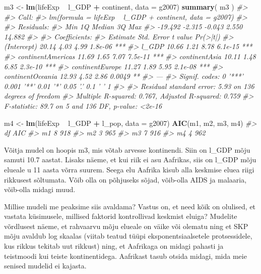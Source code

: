 \documentclass[]{book}
\newenvironment{Shaded}{\begin{snugshade}}{\end{snugshade}}
\newcommand{\KeywordTok}[1]{\textcolor[rgb]{0.13,0.29,0.53}{\textbf{#1}}}
\newcommand{\DataTypeTok}[1]{\textcolor[rgb]{0.13,0.29,0.53}{#1}}
\newcommand{\StringTok}[1]{\textcolor[rgb]{0.31,0.60,0.02}{#1}}
\newcommand{\CommentTok}[1]{\textcolor[rgb]{0.56,0.35,0.01}{\textit{#1}}}
\newcommand{\OperatorTok}[1]{\textcolor[rgb]{0.81,0.36,0.00}{\textbf{#1}}}
\newcommand{\NormalTok}[1]{#1}
\begin{document}
\begin{Shaded}
\begin{Highlighting}[]
\NormalTok{m3 <-}\StringTok{ }\KeywordTok{lm}\NormalTok{(lifeExp }\OperatorTok{~}\StringTok{ }\NormalTok{l_GDP }\OperatorTok{+}\StringTok{ }\NormalTok{continent, }\DataTypeTok{data =}\NormalTok{ g2007)}
\KeywordTok{summary}\NormalTok{( m3 )}
\CommentTok{#> }
\CommentTok{#> Call:}
\CommentTok{#> lm(formula = lifeExp ~ l_GDP + continent, data = g2007)}
\CommentTok{#> }
\CommentTok{#> Residuals:}
\CommentTok{#>     Min      1Q  Median      3Q     Max }
\CommentTok{#> -19.492  -2.315  -0.043   2.550  14.882 }
\CommentTok{#> }
\CommentTok{#> Coefficients:}
\CommentTok{#>                   Estimate Std. Error t value Pr(>|t|)    }
\CommentTok{#> (Intercept)          20.14       4.03    4.99  1.8e-06 ***}
\CommentTok{#> l_GDP                10.66       1.21    8.78  6.1e-15 ***}
\CommentTok{#> continentAmericas    11.69       1.65    7.07  7.5e-11 ***}
\CommentTok{#> continentAsia        10.11       1.48    6.85  2.3e-10 ***}
\CommentTok{#> continentEurope      11.27       1.89    5.95  2.1e-08 ***}
\CommentTok{#> continentOceania     12.93       4.52    2.86   0.0049 ** }
\CommentTok{#> ---}
\CommentTok{#> Signif. codes:  0 '***' 0.001 '**' 0.01 '*' 0.05 '.' 0.1 ' ' 1}
\CommentTok{#> }
\CommentTok{#> Residual standard error: 5.93 on 136 degrees of freedom}
\CommentTok{#> Multiple R-squared:  0.767,  Adjusted R-squared:  0.759 }
\CommentTok{#> F-statistic: 89.7 on 5 and 136 DF,  p-value: <2e-16}

\NormalTok{m4 <-}\StringTok{ }\KeywordTok{lm}\NormalTok{(lifeExp }\OperatorTok{~}\StringTok{ }\NormalTok{l_GDP }\OperatorTok{+}\StringTok{ }\NormalTok{l_pop, }\DataTypeTok{data =}\NormalTok{ g2007)}
\KeywordTok{AIC}\NormalTok{(m1, m2, m3, m4)}
\CommentTok{#>    df AIC}
\CommentTok{#> m1  8 918}
\CommentTok{#> m2  3 965}
\CommentTok{#> m3  7 916}
\CommentTok{#> m4  4 962}
\end{Highlighting}
\end{Shaded}

Võitja mudel on hoopis m3, mis võtab arvesse kontinendi. Siin on l\_GDP
mõju samuti 10.7 aastat. Lisaks näeme, et kui riik ei asu Aafrikas, siis
on l\_GDP mõju elueale u 11 aasta võrra suurem. Seega elu Aafrika kisub
alla keskmise eluea riigi rikkusest sõltumata. Võib olla on põhjuseks
sõjad, võib-olla AIDS ja malaaria, võib-olla midagi muud.

Millise mudeli me peaksime siis avaldama? Vastus on, et need kõik on
olulised, et vastata küsimusele, millised faktorid kontrollivad keskmist
eluiga? Mudelite võrdlusest näeme, et rahvaarvu mõju elueale on väike
või olematu ning et SKP mõju avaldub log skaalas (viitab teatud tüüpi
eksponentsiaalsetele protsessidele, kus rikkus tekitab uut rikkust)
ning, et Aafrikaga on midagi pahasti ja teistmoodi kui teiste
kontinentidega. Aafrikast tasub otsida midagi, mida meie senised mudelid
ei kajasta.
\end{document}
